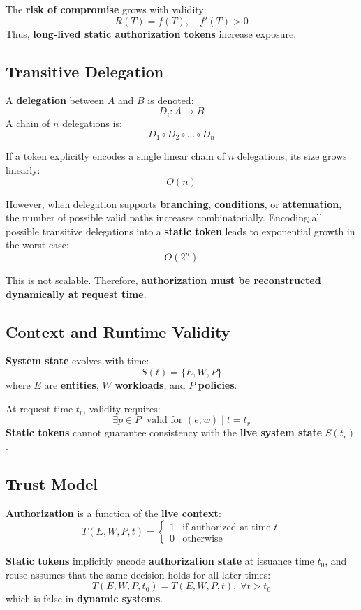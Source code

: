 The \textbf{risk of compromise} grows with validity:
\[
R(T) = f(T), \quad f'(T) > 0
\]
Thus, \textbf{long-lived static authorization tokens} increase exposure.

\subsection{Transitive Delegation}
A \textbf{delegation} between $A$ and $B$ is denoted:
\[
D_i : A \rightarrow B
\]
A chain of $n$ delegations is:
\[
D_1 \circ D_2 \circ \dots \circ D_n
\]

If a token explicitly encodes a single linear chain of $n$ delegations, 
its size grows linearly:
\[
O(n)
\]

However, when delegation supports \textbf{branching}, \textbf{conditions}, or \textbf{attenuation}, 
the number of possible valid paths increases combinatorially. 
Encoding all possible transitive delegations into a \textbf{static token} leads to exponential growth in the worst case:
\[
O(2^n)
\]

This is not scalable. Therefore, \textbf{authorization must be reconstructed dynamically at request time}.

\subsection{Context and Runtime Validity}
\textbf{System state} evolves with time:
\[
S(t) = \{E, W, P\}
\]
where $E$ are \textbf{entities}, $W$ \textbf{workloads}, and $P$ \textbf{policies}.  

At request time $t_r$, validity requires:
\[
\exists p \in P \;\; \text{valid for } (e,w) \mid t=t_r
\]
\textbf{Static tokens} cannot guarantee consistency with the \textbf{live system state} $S(t_r)$.

\subsection{Trust Model}
\textbf{Authorization} is a function of the \textbf{live context}:
\[
T(E, W, P, t) =
\begin{cases}
1 & \text{if authorized at time $t$}\\
0 & \text{otherwise}
\end{cases}
\]

\textbf{Static tokens} implicitly encode \textbf{authorization state} at issuance time $t_0$, 
and reuse assumes that the same decision holds for all later times:
\[
T(E,W,P,t_0) = T(E,W,P,t), \; \forall t>t_0
\]
which is false in \textbf{dynamic systems}.


